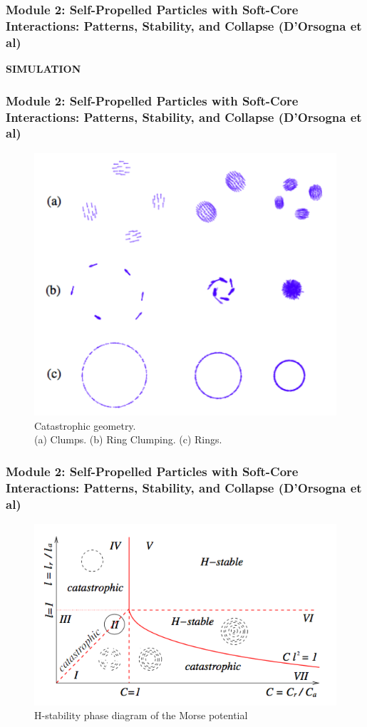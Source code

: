 \documentclass[compress]{beamer}
\begin{document}
\begin{frame}
	\frametitle{Module 2: Self-Propelled Particles with Soft-Core Interactions: Patterns, Stability, and Collapse (D'Orsogna et al)}
	
	\textbf{SIMULATION}
	
	

	
\end{frame}


\begin{frame}
	\frametitle{Module 2: Self-Propelled Particles with Soft-Core Interactions: Patterns, Stability, and Collapse (D'Orsogna et al)}
	
	
	\begin{figure}[H]
		\includegraphics[width=.6\columnwidth]{./img/ClumpsRing.png}
		\caption{Catastrophic geometry. \\(a) Clumps. (b) Ring Clumping. (c) Rings.}
		\label{clumps}
	\end{figure}
	
\end{frame}



\begin{frame}
  \frametitle{Module 2: Self-Propelled Particles with Soft-Core Interactions: Patterns, Stability, and Collapse (D'Orsogna et al)}
	
	
	\begin{figure}[H]
		\includegraphics[width=.9\columnwidth]{./img/H-stabilityPhaseDiagram.png}
		\caption{H-stability phase diagram of the Morse potential}
		\label{hstability}
	\end{figure}
	
\end{frame}
\end{document}
